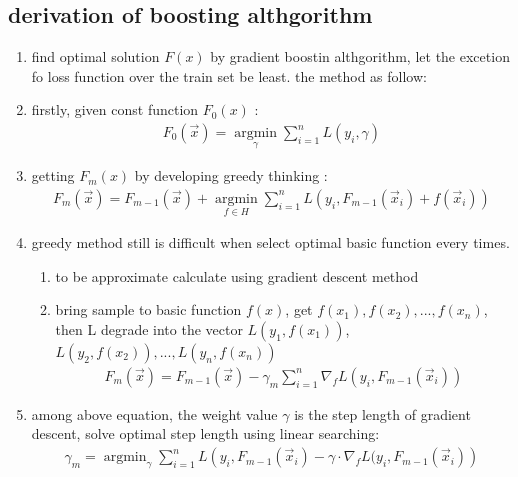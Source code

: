 \documentclass[12pt]{ctexart}%
\begin{document}
		\subsection{\quad derivation of boosting althgorithm}
			\begin{enumerate}
				\item find optimal solution $F(x)$ by gradient boostin althgorithm, let  the excetion fo loss function over the train set be least. the method as follow:
				
				\item firstly, given const function $F_0 (x)$ :
					\begin{align}
						F_0 (\vec{x}) = \mathop{\arg\min}\limits_\gamma \sum_{i=1}^{n}L(y_i, \gamma)
					\end{align}
					
				\item getting $F_m(x)$ by developing greedy thinking :
					 \begin{align}
					 	F_m(\vec{x}) = F_{m-1}(\vec{x}) + \mathop{\arg\min}\limits_{f\in H}\sum_{i=1}^{n}L(y_i, F_{m-1}(\vec{x}_i) + f(\vec{x}_i))
					 \end{align}
					 
				\item greedy method still is difficult when select optimal basic function every times.
					\begin{enumerate}
						\item to be approximate calculate using gradient descent method
						
						\item bring sample to basic function $f(x)$, get $f(x_1), f(x_2), ..., f(x_n)$, then L degrade into the vector $L(y_1, f(x_1))$, $L(y_2, f(x_2)), ..., L(y_n, f(x_n))$
							\begin{align}
								F_m(\vec{x}) = F_{m-1}(\vec{x}) - \gamma_m \sum_{i=1}^{n} \nabla_f L(y_i, F_{m-1}(\vec{x}_i))
							\end{align}

					\end{enumerate}
				
				\item among above equation, the weight value $\gamma$ is the step length of gradient descent, solve optimal step length using linear searching:
					\begin{align}
						\gamma_m = \mathop{\arg\min}_\gamma \sum_{i=1}^{n} L \left( y_i, F_{m-1}(\vec{x}_i) - \gamma\cdot\nabla_f L(y_i, F_{m-1}(\vec{x}_i) \right)
					\end{align}
			\end{enumerate}
			
\end{document}
